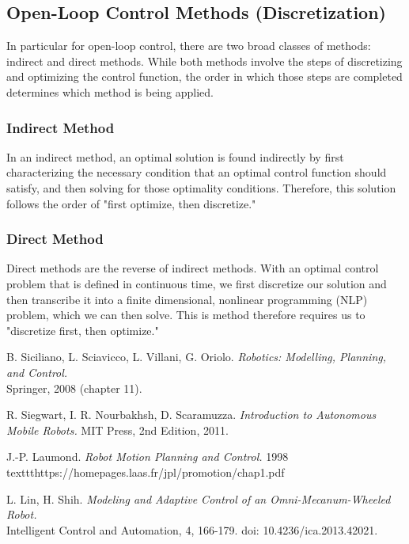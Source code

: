 \documentclass[twoside]{article}
\begin{document}
\subsection*{Open-Loop Control Methods (Discretization)}

In particular for open-loop control, there are two broad classes of methods: indirect and direct methods. While both methods involve the steps of discretizing and optimizing the control function, the order in which those steps are completed determines which method is being applied.

\subsubsection*{Indirect Method}

In an indirect method, an optimal solution is found indirectly by first characterizing the necessary condition that an optimal control function should satisfy, and then solving for those optimality conditions. Therefore, this solution follows the order of "first optimize, then discretize." 

\subsubsection*{Direct Method}

Direct methods are the reverse of indirect methods. With an optimal control problem that is defined in continuous time, we first discretize our solution and then transcribe it into a finite dimensional, nonlinear programming (NLP) problem, which we can then solve. This is method therefore requires us to "discretize first, then optimize."

\begin{thebibliography}{9}

B. Siciliano, L. Sciavicco, L. Villani, G. Oriolo.\textit{ Robotics: Modelling, Planning, and Control.} \\Springer, 2008 (chapter 11).

R. Siegwart, I. R. Nourbakhsh, D. Scaramuzza. \textit{Introduction to Autonomous Mobile Robots.} MIT Press, 2nd Edition, 2011.
 
J.-P. Laumond. \textit{Robot Motion Planning and Control.} 1998 \\texttt{https://homepages.laas.fr/jpl/promotion/chap1.pdf}

L. Lin, H. Shih. \textit{Modeling and Adaptive Control of an Omni-Mecanum-Wheeled Robot.} \\Intelligent Control and Automation, 4, 166-179. doi: 10.4236/ica.2013.42021.

\end{thebibliography}
\end{document}
